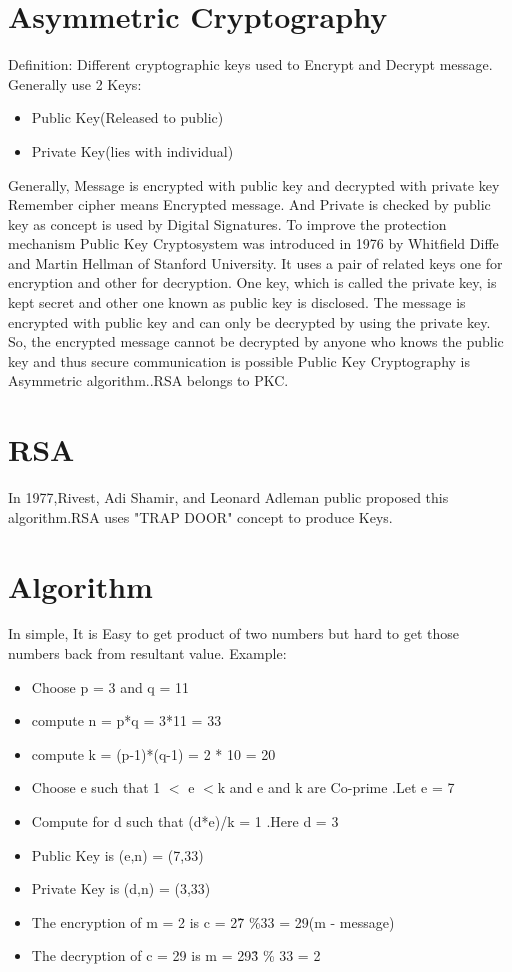 \documentclass[12pt,a4paper]{report}
\begin{document}
\section{Asymmetric Cryptography}
Definition: Different cryptographic keys used to Encrypt and Decrypt message.
Generally use 2 Keys:
	\begin{itemize}
	\item Public Key(Released to public)
    \item Private Key(lies with individual)
	\end{itemize}
Generally, Message is encrypted with public key and decrypted with private key
Remember cipher means Encrypted message.
And Private is checked by public key as concept is used by Digital Signatures.
To improve the protection mechanism Public Key Cryptosystem was introduced in 1976 by Whitfield Diffe and Martin Hellman of Stanford University. It uses a pair of related keys one for encryption and other for decryption. One key, which is called the private key, is kept secret and other one known as public key is disclosed.  The message is encrypted with public key and can only be decrypted by using the private key. So, the encrypted message cannot be decrypted by anyone who knows the public key and thus secure communication is possible
Public Key Cryptography is Asymmetric algorithm..RSA belongs to PKC.
\section{RSA}
In 1977,Rivest, Adi Shamir, and Leonard Adleman public proposed this algorithm.RSA uses "TRAP DOOR" concept to produce Keys.
\section*{Algorithm}
In simple,
	It is Easy to get product of two numbers but hard to get those numbers back from resultant value.
    Example:
\begin{itemize}
\item Choose p = 3 and q = 11
\item compute n = p*q = 3*11 = 33
\item compute k = (p-1)*(q-1) = 2 * 10 = 20
\item Choose e such that 1 $<$ e $<$k and e and k are Co-prime .Let e = 7
\item Compute for d such that (d*e)/k = 1 .Here d = 3
\item Public Key is (e,n) = (7,33)
\item Private Key is (d,n) = (3,33)
\item The encryption of m = 2 is c = 2\^7 \%33 = 29(m - message)
\item The decryption of c = 29 is m = 29\^3 \% 33 = 2
\end{itemize}
\end{document}
